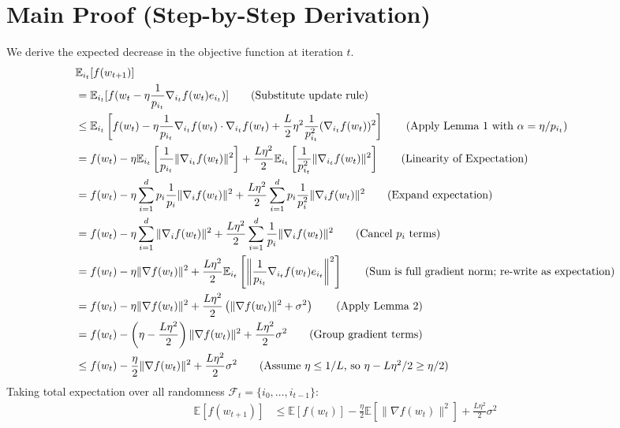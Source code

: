 \documentclass{article}
\begin{document}
\section*{Main Proof (Step-by-Step Derivation)}
We derive the expected decrease in the objective function at iteration $t$.
\begin{align*}
    &\mathbb{E}_{i_t}[f(w_{t+1})] \\
    &= \mathbb{E}_{i_t}[f(w_t - \eta \frac{1}{p_{i_t}} \nabla_{i_t} f(w_t) e_{i_t})] \tag{Substitute update rule} \\
    &\leq \mathbb{E}_{i_t} \left[ f(w_t) - \eta \frac{1}{p_{i_t}} \nabla_{i_t} f(w_t) \cdot \nabla_{i_t} f(w_t) + \frac{L}{2} \eta^2 \frac{1}{p_{i_t}^2} (\nabla_{i_t} f(w_t))^2 \right] \tag{Apply Lemma 1 with $\alpha = \eta / p_{i_t}$} \\
    &= f(w_t) - \eta \mathbb{E}_{i_t} \left[ \frac{1}{p_{i_t}} \|\nabla_{i_t} f(w_t)\|^2 \right] + \frac{L \eta^2}{2} \mathbb{E}_{i_t} \left[ \frac{1}{p_{i_t}^2} \|\nabla_{i_t} f(w_t)\|^2 \right] \tag{Linearity of Expectation} \\
    &= f(w_t) - \eta \sum_{i=1}^d p_i \frac{1}{p_i} \|\nabla_i f(w_t)\|^2 + \frac{L \eta^2}{2} \sum_{i=1}^d p_i \frac{1}{p_i^2} \|\nabla_i f(w_t)\|^2 \tag{Expand expectation} \\
    &= f(w_t) - \eta \sum_{i=1}^d \|\nabla_i f(w_t)\|^2 + \frac{L \eta^2}{2} \sum_{i=1}^d \frac{1}{p_i} \|\nabla_i f(w_t)\|^2 \tag{Cancel $p_i$ terms} \\
    &= f(w_t) - \eta \|\nabla f(w_t)\|^2 + \frac{L \eta^2}{2} \mathbb{E}_{i_t} \left[ \left\| \frac{1}{p_{i_t}} \nabla_{i_t} f(w_t) e_{i_t} \right\|^2 \right] \tag{Sum is full gradient norm; re-write as expectation} \\
    &= f(w_t) - \eta \|\nabla f(w_t)\|^2 + \frac{L \eta^2}{2} \left( \|\nabla f(w_t)\|^2 + \sigma^2 \right) \tag{Apply Lemma 2} \\
    &= f(w_t) - \left( \eta - \frac{L \eta^2}{2} \right) \|\nabla f(w_t)\|^2 + \frac{L \eta^2}{2} \sigma^2 \tag{Group gradient terms} \\
    &\leq f(w_t) - \frac{\eta}{2} \|\nabla f(w_t)\|^2 + \frac{L \eta^2}{2} \sigma^2 \tag{Assume $\eta \leq 1/L$, so $\eta - L\eta^2/2 \geq \eta/2$}
\end{align*}
Taking total expectation over all randomness $\mathcal{F}_t = \{i_0, \dots, i_{t-1}\}$:
\begin{align*}
    \mathbb{E}[f(w_{t+1})] &\leq \mathbb{E}[f(w_t)] - \frac{\eta}{2} \mathbb{E}[\|\nabla f(w_t)\|^2] + \frac{L \eta^2}{2} \sigma^2 \tag{Total expectation}
\end{align*}
\end{document}
